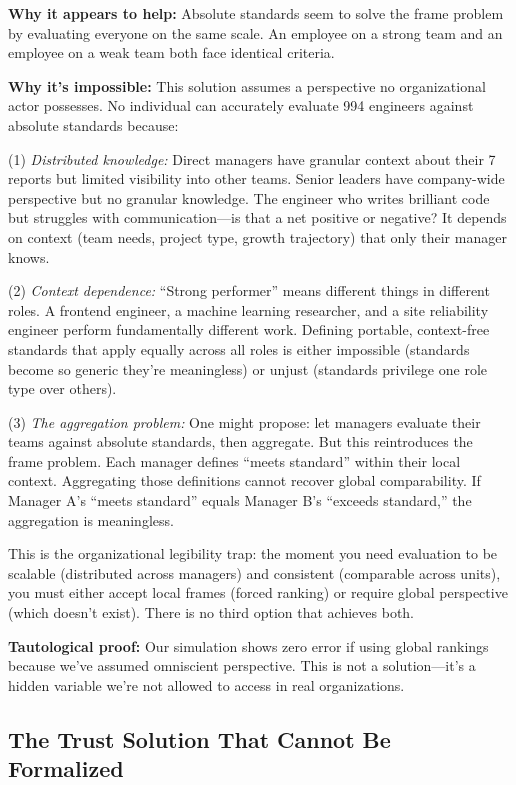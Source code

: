 \documentclass[12pt]{article}
\begin{document}
\textbf{Why it appears to help:} Absolute standards seem to solve the frame problem by evaluating everyone on the same scale. An employee on a strong team and an employee on a weak team both face identical criteria.

\textbf{Why it's impossible:} This solution assumes a perspective no organizational actor possesses. No individual can accurately evaluate 994 engineers against absolute standards because:

(1) \emph{Distributed knowledge:} Direct managers have granular context about their 7 reports but limited visibility into other teams. Senior leaders have company-wide perspective but no granular knowledge. The engineer who writes brilliant code but struggles with communication---is that a net positive or negative? It depends on context (team needs, project type, growth trajectory) that only their manager knows.

(2) \emph{Context dependence:} ``Strong performer'' means different things in different roles. A frontend engineer, a machine learning researcher, and a site reliability engineer perform fundamentally different work. Defining portable, context-free standards that apply equally across all roles is either impossible (standards become so generic they're meaningless) or unjust (standards privilege one role type over others).

(3) \emph{The aggregation problem:} One might propose: let managers evaluate their teams against absolute standards, then aggregate. But this reintroduces the frame problem. Each manager defines ``meets standard'' within their local context. Aggregating those definitions cannot recover global comparability. If Manager A's ``meets standard'' equals Manager B's ``exceeds standard,'' the aggregation is meaningless.

This is the organizational legibility trap: the moment you need evaluation to be scalable (distributed across managers) and consistent (comparable across units), you must either accept local frames (forced ranking) or require global perspective (which doesn't exist). There is no third option that achieves both.

\textbf{Tautological proof:} Our simulation shows zero error if using global rankings because we've assumed omniscient perspective. This is not a solution---it's a hidden variable we're not allowed to access in real organizations.

\subsection{The Trust Solution That Cannot Be Formalized}
\end{document}
